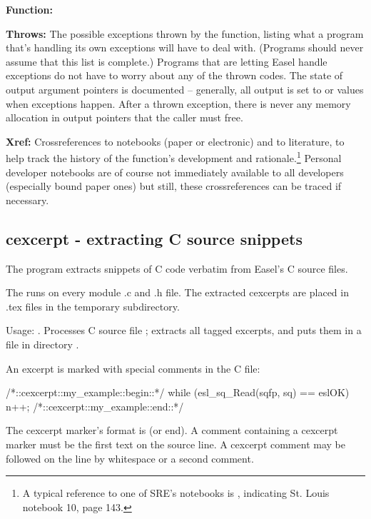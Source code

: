 \begin{sreitems}{\textbf{Function:}}
\item[\textbf{Throws:}] The possible exceptions thrown by the
  function, listing what a program that's handling its own exceptions
  will have to deal with. (Programs should never assume that this list
  is complete.) Programs that are letting Easel handle exceptions do
  not have to worry about any of the thrown codes.  The state of
  output argument pointers is documented -- generally, all output is
  set to  or  values when exceptions happen.
  After a thrown exception, there is never any memory allocation in
  output pointers that the caller must free.

\item[\textbf{Xref:}] Crossreferences to notebooks (paper or
  electronic) and to literature, to help track the history of the
  function's development and rationale.\footnote{A typical reference
  to one of SRE's notebooks is , indicating St. Louis
  notebook 10, page 143.} Personal developer notebooks are of course
  not immediately available to all developers (especially bound paper
  ones) but still, these crossreferences can be traced if necessary.
\end{sreitems}

\subsection{cexcerpt - extracting C source snippets}

The  program extracts snippets of C code verbatim from
Easel's C source files.

The  runs  on every
module .c and .h file. The extracted cexcerpts are placed in .tex
files in the temporary  subdirectory.

Usage: . Processes C source file
; extracts all tagged excerpts, and puts them in a file
in directory .

An excerpt is marked with special comments in the C file:
\begin{cchunk}
/*::cexcerpt::my_example::begin::*/
   while (esl_sq_Read(sqfp, sq) == eslOK)
     { n++; }
/*::cexcerpt::my_example::end::*/
\end{cchunk}

The cexcerpt marker's format is  (or
end). A comment containing a cexcerpt marker must be the first text on
the source line. A cexcerpt comment may be followed on the line by
whitespace or a second comment.

